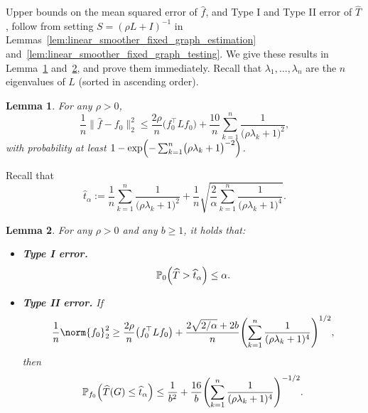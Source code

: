 \documentclass[twoside]{article}
\newcommand{\1}{\mathbf{1}}
\newcommand{\Lap}{L}
\newcommand{\Pbb}{\mathbb{P}}
\newcommand{\wh}[1]{\widehat{#1}}
\newtheorem{lemma}{Lemma}
\theoremstyle{definition}
\theoremstyle{remark}
\begin{document}
Upper bounds on the mean squared error of $\wh{f}$, and Type I and Type II error of $\wh{T}$, follow from setting $S = (\rho L + I)^{-1}$ in Lemmas~\ref{lem:linear_smoother_fixed_graph_estimation} and~\ref{lem:linear_smoother_fixed_graph_testing}. We give these results in Lemma~\ref{lem:ls_fixed_graph_estimation} and~\ref{lem:ls_fixed_graph_testing}, and prove them immediately. Recall that $\lambda_1,\ldots,\lambda_n$ are the $n$ eigenvalues of $\Lap$ (sorted in ascending order).
\begin{lemma}
	\label{lem:ls_fixed_graph_estimation}
	For any $\rho > 0$,
	\begin{equation}
	\label{eqn:ls_fixed_graph_estimation_prob}
	\frac{1}{n}\bigl\|\wh{f} - f_0\bigr\|_2^2 \leq \frac{2\rho}{n} \bigl(f_0^{\top} \Lap f_0\bigr) + \frac{10}{n}\sum_{k = 1}^{n} \frac{1}{\bigl(\rho \lambda_{k} + 1\bigr)^2},
	\end{equation}
	with probability at least $1 - \exp\Bigl(-\sum_{k = 1}^{n}\bigl(\rho \lambda_k + 1\bigr)^{-2}\Bigr)$.
\end{lemma}
Recall that 
\begin{equation*}
\wh{t}_{\alpha} := \frac{1}{n}\sum_{k = 1}^{n} \frac{1}{\bigl(\rho \lambda_k + 1\bigr)^2} + \frac{1}{n}\sqrt{\frac{2}{\alpha}\sum_{k = 1}^{n} \frac{1}{\bigl(\rho \lambda_k + 1\bigr)^4}}.
\end{equation*}
\begin{lemma}
	\label{lem:ls_fixed_graph_testing}
	For any $\rho > 0$ and any $b \geq 1$, it holds that:
	\begin{itemize}
		\item \textbf{Type I error.}
		\begin{equation}
		\label{eqn:ls_fixed_graph_testing_typeI}
		\Pbb_0\Bigl(\wh{T} > \wh{t}_{\alpha}\Bigr) \leq \alpha.
		\end{equation}
		\item \textbf{Type II error.} If
		\begin{equation}
		\label{eqn:ls_fixed_graph_testing_critical_radius}
		\frac{1}{n}\norm{f_0}_2^2 \geq \frac{2 \rho}{n} \bigl(f_0^{\top} \Lap f_0\bigr) + \frac{2\sqrt{2/\alpha} + 2b}{n} \Biggl(\sum_{k = 1}^{n} \frac{1}{(\rho\lambda_k + 1)^4} \Biggr)^{1/2},
		\end{equation}
		then
		\begin{equation}
		\label{eqn:ls_fixed_graph_testing_typeII}
		\Pbb_{f_0}\Bigl(\wh{T}(G) \leq \wh{t}_{\alpha}\Bigr) \leq \frac{1}{b^2} + \frac{16}{b} \Biggl(\sum_{k = 1}^{n} \frac{1}{(\rho\lambda_k + 1)^4} \Biggr)^{-1/2}.
		\end{equation}
	\end{itemize}
\end{lemma}
\end{document}
